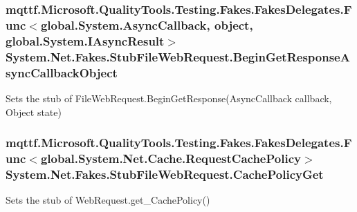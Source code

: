 \hypertarget{class_system_1_1_net_1_1_fakes_1_1_stub_file_web_request_a7f17f2eb6a920ec774ae695bf060777b}{
\subsubsection[{Begin\-Get\-Response\-Async\-Callback\-Object}]{\setlength{\rightskip}{0pt plus 5cm}mqttf.\-Microsoft.\-Quality\-Tools.\-Testing.\-Fakes.\-Fakes\-Delegates.\-Func$<$global.\-System.\-Async\-Callback, object, global.\-System.\-I\-Async\-Result$>$ System.\-Net.\-Fakes.\-Stub\-File\-Web\-Request.\-Begin\-Get\-Response\-Async\-Callback\-Object}}\label{class_system_1_1_net_1_1_fakes_1_1_stub_file_web_request_a7f17f2eb6a920ec774ae695bf060777b}


Sets the stub of File\-Web\-Request.\-Begin\-Get\-Response(\-Async\-Callback callback, Object state)

\hypertarget{class_system_1_1_net_1_1_fakes_1_1_stub_file_web_request_a9f5e5f5912c118c18fbff98a91d769fe}{
\subsubsection[{Cache\-Policy\-Get}]{\setlength{\rightskip}{0pt plus 5cm}mqttf.\-Microsoft.\-Quality\-Tools.\-Testing.\-Fakes.\-Fakes\-Delegates.\-Func$<$global.\-System.\-Net.\-Cache.\-Request\-Cache\-Policy$>$ System.\-Net.\-Fakes.\-Stub\-File\-Web\-Request.\-Cache\-Policy\-Get}}\label{class_system_1_1_net_1_1_fakes_1_1_stub_file_web_request_a9f5e5f5912c118c18fbff98a91d769fe}


Sets the stub of Web\-Request.\-get\-\_\-\-Cache\-Policy()


